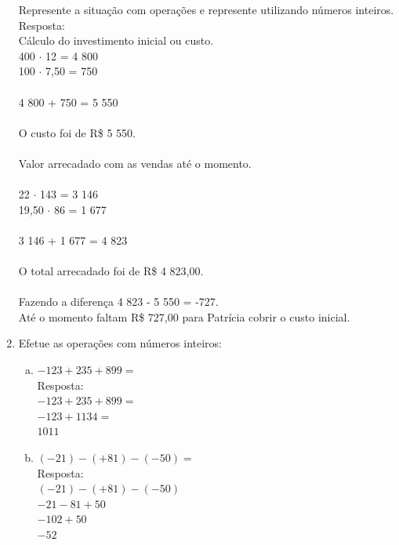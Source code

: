 \documentclass[a4paper,14pt]{article}
\begin{document}
\begin{multicols}{2}
\begin{enumerate}
			Represente a situação com operações e represente utilizando números inteiros. \\
			
			 \selectfont
			Resposta:\\
			
			Cálculo do investimento inicial ou custo.\\
			400 $\cdot$ 12 = 4 800\\
			100 $\cdot$ 7,50 = 750\\
			\\
			4 800 + 750 = 5 550\\
			\\
			O custo foi de R\$ 5 550.\\
			\\
			Valor arrecadado com as vendas até o momento.\\\\
			22 $\cdot$ 143 = 3 146\\
			19,50 $\cdot$ 86 = 1 677\\
			\\
			3 146 + 1 677 = 4 823\\
			\\
			O total arrecadado foi de R\$ 4 823,00.\\
			\\
			Fazendo a diferença 4 823 - 5 550 = -727.\\
			
			Até o momento faltam R\$ 727,00 para Patrícia cobrir o custo inicial.
			
			 \selectfont
			
			\item Efetue as operações com números inteiros:
			\begin{enumerate}[a)]
				\item $-123 + 235 + 899 = $ \\
				
				Resposta: \\
				
				$-123 + 235 + 899 = $ \\
				$-123 + 1134 = $ \\
				$1011$ \\
				
				\item $(-21)-(+81)-(-50) = $ \\
				
				Resposta: \\
				
				$(-21)-(+81)-(-50)$ \\
				$-21 - 81 + 50$ \\
				$-102 + 50$ \\
				$-52$ \\\\\\\\\\\\\\\\
				

\end{enumerate}
\end{enumerate}
\end{multicols}
\end{document}
